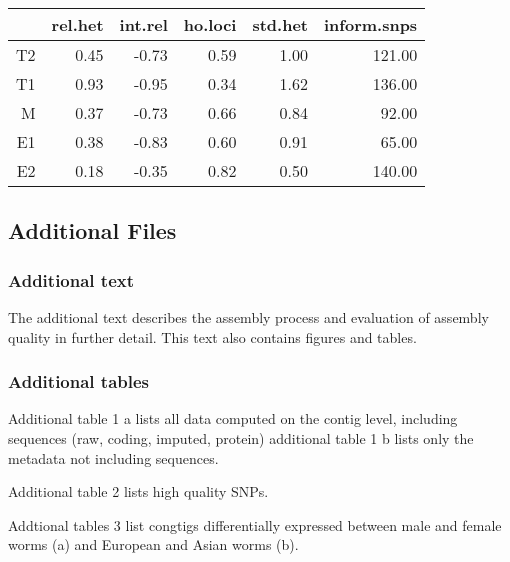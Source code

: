 \documentclass[10pt]{bmc_article}
\newenvironment{bmcformat}{\begin{raggedright}\baselineskip20pt\sloppy\setboolean{publ}{false}}{\end{raggedright}\baselineskip20pt\sloppy}
\begin{document}
\begin{bmcformat}
\begin{table}[ht]
\begin{center}
\begin{tabular}{rrrrrr}
  \hline
 & rel.het & int.rel & ho.loci & std.het & inform.snps \\ 
  \hline
T2 & 0.45 & -0.73 & 0.59 & 1.00 & 121.00 \\ 
  T1 & 0.93 & -0.95 & 0.34 & 1.62 & 136.00 \\ 
  M & 0.37 & -0.73 & 0.66 & 0.84 & 92.00 \\ 
  E1 & 0.38 & -0.83 & 0.60 & 0.91 & 65.00 \\ 
  E2 & 0.18 & -0.35 & 0.82 & 0.50 & 140.00 \\ 
   \hline
\end{tabular}
\end{center}
\end{table}
\normalsize


\subsection*{Additional Files}

\subsubsection*{Additional text}
The additional text describes the assembly process and evaluation of
assembly quality in further detail. This text also contains figures
and tables.

\subsubsection*{Additional tables}

Additional table 1 a lists all data computed on the contig level,
including sequences (raw, coding, imputed, protein) additional table 1
b lists only the metadata not including sequences.

Additional table 2 lists high quality SNPs.

Addtional tables 3 list congtigs differentially expressed between male
and female worms (a) and European and Asian worms (b).



\end{bmcformat}
\end{document}
